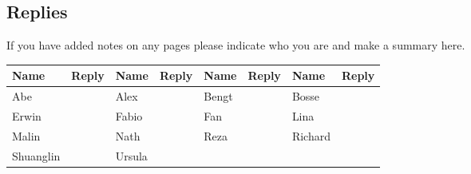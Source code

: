 \documentclass{article}
\begin{document}
\begin{appendices}

\newpage

\section{Replies}

If you have added notes on any pages please indicate who you are and
make a summary here.

\bigskip
{\Large
\begin{tabular}{|l|l||l|l||l|l||l|l|}\hline
Name      & Reply & Name   & Reply & Name  & Reply & Name  & Reply \\\hline 
  Abe     &      & Alex    &      & Bengt   &      &  Bosse   &  \\\hline
  Erwin   &      & Fabio   &      & Fan     &      &  Lina    &  \\\hline
  Malin   &      & Nath    &      & Reza    &      &  Richard &   \\\hline
  Shuanglin &    & Ursula  &      &         &      &          &   \\\hline
\end{tabular}
}

\end{appendices}
\end{document}

